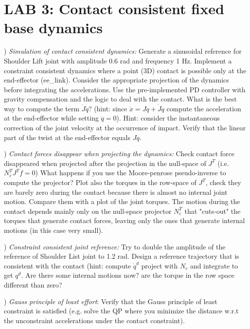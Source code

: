 \documentclass{report}
\begin{document}
\section*{LAB 3: Contact consistent fixed base dynamics}


\quad

) \textit{Simulation of contact consistent dynamics:}
Generate a sinusoidal reference for Shoulder Lift joint with amplitude 0.6 rad and frequency 1 Hz.
Implement a constraint consistent dynamics where a point (3D) contact is possible only at the end-effector (ee\_link). 
Consider the appropriate projection of the dynamics before integrating the accelerations. 
Use the pre-implemented PD controller with gravity compensation and the logic 
to deal with the contact. What is the best way to compute the term $\dot{J}\dot{q}$? (hint: since $\ddot{x} = J\ddot{q} + \dot{J}\dot{q}$ compute the acceleration at the end-effector while setting $\ddot{q}= 0$).
Hint: consider the instantaneous correction of the joint velocity at the occurrence of impact.
Verify that the linear part of the twist at the end-effector equals $J\dot{q}$.

\quad

) \textit{Contact forces disappear when projecting the dynamics:}
Check contact force disappeared when projected after the projection in the null-space of $J^T$  (i.e. $ N_c^TJ^Tf = 0$) 
What happens if you use the Moore-penrose pseudo-inverse to compute the projector?
Plot also the torques in the row-space of $J^T$, check they are barely zero 
during the contact because there is almost no internal joint motion. 
Compare them with a plot of the joint torques.
The motion during the contact depends mainly only on the null-space projector $N_c^T$
that "cuts-out" the torques that generate contact forces, leaving only the ones that generate internal motions (in this case very small).

\quad

) \textit{Constraint consistent joint reference:}
Try to double the amplitude of the reference of Shoulder List joint to 1.2 rad.
Design a reference trajectory that is consistent with the contact (hint: compute $\dot{q}^{d}$ project with $N_c$ and integrate to get $q^d$.
Are there some internal motions now? are the torque in the row space different than zero?  

\quad

) \textit{Gauss principle of least effort}:
Verify that the Gauss principle of least constraint is satisfied (e.g. solve the QP where you minimize the distance w.r.t the unconstraint accelerations under the contact constraint).
\end{document}

